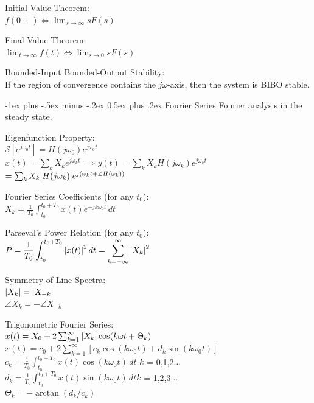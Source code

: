 \documentclass[12pt,landscape,letterpaper]{article}
\makeatletter
\renewcommand{\section}{\@startsection{section}{1}{0mm}%
                                {-1ex plus -.5ex minus -.2ex}%
                                {0.5ex plus .2ex}%
                                {\normalfont\normalsize\bfseries}}
\newcommand{\tab}{\hspace{0.02\textwidth}}
\newcommand{\ds}{\displaystyle}
\makeatother
\begin{document}
\begin{multicols*}{3}
Initial Value Theorem:\\
\tab $\ds f(0+) \Leftrightarrow \lim_{s\rightarrow\infty} sF(s)$

Final Value Theorem:\\
\tab $\ds \lim_{t\rightarrow\infty} f(t) \Leftrightarrow \lim_{s\rightarrow 0} sF(s)$

Bounded-Input Bounded-Output Stability:\\
\tab If the region of convergence contains the $j\omega$-axis, then the system is BIBO stable.

\section{Fourier Series}
\tab Fourier analysis in the steady state.

Eigenfunction Property:\\
\tab $\mathcal{S}[e^{j\omega_0t}] = H(j\omega_0)e^{j\omega_0t}$\\
\tab $x(t) = \sum_k X_k e^{j\omega_kt} \implies y(t) = \sum_k X_k H(j\omega_k)e^{j\omega_kt}$\\\vspace{1mm}\hspace{2.5cm}$= \sum_k X_k \abs{H(j\omega_k)}e^{j(\omega_kt + \angle H(\omega_k))}$

Fourier Series Coefficients (for any $t_0$):\\
\tab $\ds X_k = \frac{1}{T_0}\int_{t_0}^{t_0 + T_0}x(t)e^{-jk\omega_0t}\,dt$

Parseval's Power Relation (for any $t_0$):\\
\tab $\ds P = \frac{1}{T_0} \int_{t_0}^{t_0 + T_0}\abs{x(t)}^2\,dt = \sum_{k = -\infty}^{\infty}\abs{X_k}^2$

Symmetry of Line Spectra:\\
\tab $\abs{X_k} = \abs{X_{-k}}$\\
\tab $\angle X_k = -\angle X_{-k}$

Trigonometric Fourier Series:\\
\tab $x(t) = X_0 + 2\sum_{k = 1}^{\infty}\abs{X_k}\cos(k\omega t + \Theta_k)$\\
\tab $x(t) = c_0 + 2\sum_{k = 1}^{\infty}[c_k\cos(k\omega_0 t) + d_k\sin(k\omega_0 t)]$\\
\tab $c_k = \frac{1}{T_0} \int_{t_0}^{t_0 + T_0}x(t)\cos(k\omega_0 t)\,dt$ \quad $k$ = 0,1,2$\ldots$\\
\tab $d_k = \frac{1}{T_0} \int_{t_0}^{t_0 + T_0}x(t)\sin(k\omega_0 t)\,dt$\quad $k$ = 1,2,3$\ldots$\\
\tab $\Theta_k = -\arctan(d_k/c_k)$


\end{multicols*}
\end{document}
